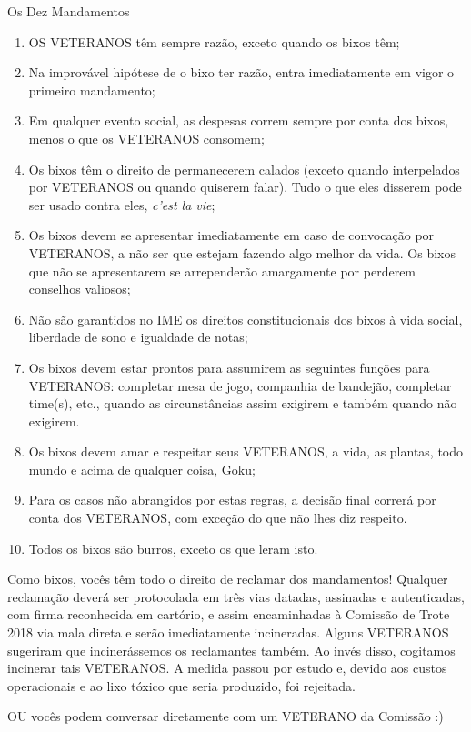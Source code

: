 \begin{editorial}{Os Dez Mandamentos}

\begin{enumerate}
  \item OS VETERANOS têm sempre razão, exceto quando os bixos têm;
  \item Na improvável hipótese de o bixo ter razão, entra imediatamente em vigor
        o primeiro mandamento;
  \item Em qualquer evento social, as despesas correm sempre por conta dos
        bixos, menos o que os VETERANOS consomem;
  \item Os bixos têm o direito de permanecerem calados (exceto quando
        interpelados por VETERANOS ou quando quiserem falar). Tudo o que eles
        disserem pode ser usado contra eles, \textit{c’est la vie};
  \item Os bixos devem se apresentar imediatamente em caso de convocação por
        VETERANOS, a não ser que estejam fazendo algo melhor da vida. Os bixos
        que não se apresentarem se arrependerão amargamente por perderem
        conselhos valiosos; %
  \item Não são garantidos no IME os direitos constitucionais dos bixos à vida
        social, liberdade de sono e igualdade de notas;
  \item Os bixos devem estar prontos para assumirem as seguintes funções para
        VETERANOS: completar mesa de jogo, companhia de bandejão, completar
        time(s), etc., quando as circunstâncias assim exigirem e também quando
        não exigirem.
  \item Os bixos devem amar e respeitar seus VETERANOS, a vida, as plantas,
        todo mundo e acima de qualquer coisa, Goku;
  \item Para os casos não abrangidos por estas regras, a decisão final correrá
        por conta dos VETERANOS, com exceção do que não lhes diz respeito.
  \item Todos os bixos são burros, exceto os que leram isto.
\end{enumerate}

Como bixos, vocês têm todo o direito de reclamar dos mandamentos! Qualquer
reclamação deverá ser protocolada em três vias datadas, assinadas e
autenticadas, com firma reconhecida em cartório, e assim encaminhadas à
Comissão de Trote 2018 %
via mala direta e serão imediatamente incineradas. Alguns VETERANOS sugeriram
que incinerássemos os reclamantes também. Ao invés disso, cogitamos incinerar
tais VETERANOS. A medida passou por estudo e, devido aos custos operacionais e
ao lixo tóxico que seria produzido, foi rejeitada.

OU vocês podem conversar diretamente com um VETERANO da Comissão :)

\end{editorial}
